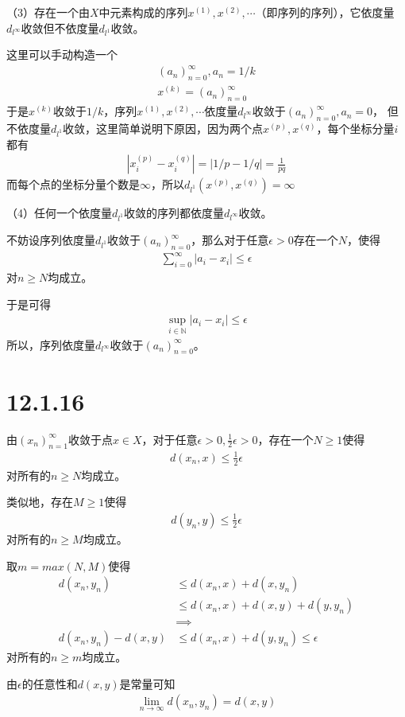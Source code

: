 \documentclass{article}
\begin{document}
（3）存在一个由$X$中元素构成的序列$x^{(1)}, x^{(2)}, \cdots$（即序列的序列），它依度量$d_{l^\infty}$收敛但不依度量$d_{l^1}$收敛。

这里可以手动构造一个
\begin{align*}
      (a_n)_{n=0}^\infty, a_n = 1/k \\
      x^{(k)} = (a_n)_{n=0}^\infty
\end{align*}
于是$x^{(k)}$收敛于$1/k$，序列$x^{(1)}, x^{(2)}, \cdots$依度量$d_{l^\infty}$收敛于$(a_n)_{n=0}^\infty, a_n = 0$，
但不依度量$d_{l^1}$收敛，这里简单说明下原因，因为两个点$x^{(p)}, x^{(q)}$，每个坐标分量$i$都有
\begin{align*}
      |x^{(p)}_i - x^{(q)}_i| = |1/p - 1/q| = \frac{1}{pq}
\end{align*}
而每个点的坐标分量个数是$\infty$，所以$d_{l^1}(x^{(p)}, x^{(q)}) = \infty$

（4）任何一个依度量$d_{l^1}$收敛的序列都依度量$d_{l^\infty}$收敛。

不妨设序列依度量$d_{l^1}$收敛于$(a_n)_{n=0}^\infty$，那么对于任意$\epsilon > 0$存在一个$N$，使得
\begin{align*}
      \sum \limits_{i = 0}^\infty |a_i - x_i| \leq \epsilon
\end{align*}
对$n \geq N$均成立。

于是可得
\begin{align*}
      \sup \limits_{i \in \mathbb{N}} |a_i - x_i| \leq \epsilon
\end{align*}
所以，序列依度量$d_{l^\infty}$收敛于$(a_n)_{n=0}^\infty$。

\section*{12.1.16}

由$(x_n)_{n=1}^\infty$收敛于点$x \in X$，对于任意$\epsilon > 0, \frac{1}{2} \epsilon > 0$，存在一个$N \geq 1$使得
\begin{align*}
      d(x_n, x) \leq \frac{1}{2} \epsilon
\end{align*}
对所有的$n \geq N$均成立。

类似地，存在$M \geq 1$使得
\begin{align*}
      d(y_n, y) \leq \frac{1}{2} \epsilon
\end{align*}
对所有的$n \geq M$均成立。

取$m = max(N, M)$使得
\begin{align*}
      d(x_n, y_n)           & \leq d(x_n, x) + d(x, y_n)                \\
                            & \leq d(x_n, x) + d(x, y) + d(y, y_n)      \\
                            & \implies                                  \\
      d(x_n, y_n) - d(x, y) & \leq  d(x_n, x) + d(y, y_n) \leq \epsilon
\end{align*}
对所有的$n \geq m$均成立。

由$\epsilon$的任意性和$d(x, y)$是常量可知
\begin{align*}
      \lim\limits_{n \to \infty} d(x_n, y_n) = d(x, y)
\end{align*}
\end{document}
